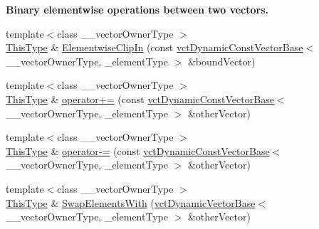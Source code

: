 \begin{Indent}{\bf Binary elementwise operations between two vectors.}
\begin{DoxyCompactItemize}
{\footnotesize template$<$class \+\_\+\+\_\+vector\+Owner\+Type $>$ }\\\hyperlink{classvct_dynamic_const_vector_base_a39da273523717f678f54d3321ebca3dd}{This\+Type} \& \hyperlink{classvct_dynamic_vector_base_a34ebdb5ea47bb05882b5db91c1a4987a}{Elementwise\+Clip\+In} (const \hyperlink{classvct_dynamic_const_vector_base}{vct\+Dynamic\+Const\+Vector\+Base}$<$ \+\_\+\+\_\+vector\+Owner\+Type, \+\_\+element\+Type $>$ \&bound\+Vector)
\item 
{\footnotesize template$<$class \+\_\+\+\_\+vector\+Owner\+Type $>$ }\\\hyperlink{classvct_dynamic_const_vector_base_a39da273523717f678f54d3321ebca3dd}{This\+Type} \& \hyperlink{classvct_dynamic_vector_base_ac2f6969f2446d396f892de7345b179c5}{operator+=} (const \hyperlink{classvct_dynamic_const_vector_base}{vct\+Dynamic\+Const\+Vector\+Base}$<$ \+\_\+\+\_\+vector\+Owner\+Type, \+\_\+element\+Type $>$ \&other\+Vector)
\item 
{\footnotesize template$<$class \+\_\+\+\_\+vector\+Owner\+Type $>$ }\\\hyperlink{classvct_dynamic_const_vector_base_a39da273523717f678f54d3321ebca3dd}{This\+Type} \& \hyperlink{classvct_dynamic_vector_base_abf61f9e3ee6622ab355b8b34f0fceace}{operator-\/=} (const \hyperlink{classvct_dynamic_const_vector_base}{vct\+Dynamic\+Const\+Vector\+Base}$<$ \+\_\+\+\_\+vector\+Owner\+Type, \+\_\+element\+Type $>$ \&other\+Vector)
\item 
{\footnotesize template$<$class \+\_\+\+\_\+vector\+Owner\+Type $>$ }\\\hyperlink{classvct_dynamic_const_vector_base_a39da273523717f678f54d3321ebca3dd}{This\+Type} \& \hyperlink{classvct_dynamic_vector_base_aa18ec9599ba05be407f344ee33085188}{Swap\+Elements\+With} (\hyperlink{classvct_dynamic_vector_base}{vct\+Dynamic\+Vector\+Base}$<$ \+\_\+\+\_\+vector\+Owner\+Type, \+\_\+element\+Type $>$ \&other\+Vector)
\end{DoxyCompactItemize}
\end{Indent}

